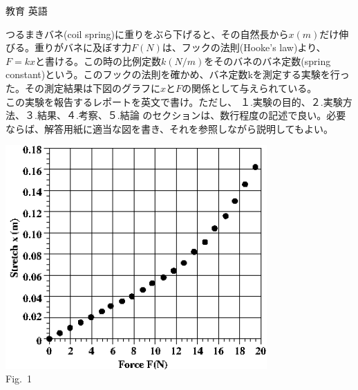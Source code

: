 \documentclass[fleqn]{jbook}
\begin{document}
\begin{question}{教育 英語}{}
\begin{subquestions}
\SubQuestion
つるまきバネ(coil spring)に重りをぶら下げると、その自然長から$x(m)$だけ伸びる。重りがバネに及ぼす力$F(N)$は、フックの法則(Hooke's law)より、$F=kx$と書ける。この時の比例定数$k(N/m)$をそのバネのバネ定数(spring constant)という。このフックの法則を確かめ、バネ定数kを測定する実験を行った。その測定結果は下図のグラフに$x$と$F$の関係として与えられている。\\
この実験を報告するレポートを英文で書け。ただし、 １.実験の目的、２.実験方法、３.結果、４.考察、５.結論 のセクションは、数行程度の記述で良い。必要ならば、解答用紙に適当な図を書き、それを参照しながら説明してもよい。\\
\begin{center}
\includegraphics[clip,width=100mm]{1998eng2.eps}\\
{\Large Fig.~1}
\end{center}

\end{subquestions}
\end{question}
\end{document}
